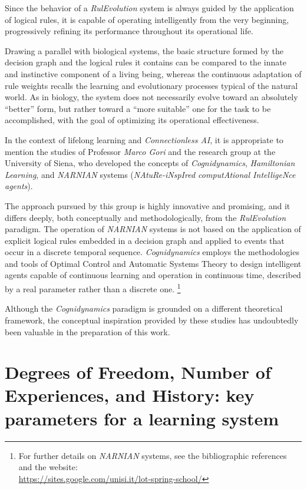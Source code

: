 \documentclass[12pt,a4paper]{article}
\begin{document}
Since the behavior of a \textit{RulEvolution} system is always guided by the application of logical rules, it is capable of operating intelligently from the very beginning, progressively refining its performance throughout its operational life.

Drawing a parallel with biological systems, the basic structure formed by the decision graph and the logical rules it contains can be compared to the innate and instinctive component of a living being, whereas the continuous adaptation of rule weights recalls the learning and evolutionary processes typical of the natural world.  
As in biology, the system does not necessarily evolve toward an absolutely “better” form, but rather toward a “more suitable” one for the task to be accomplished, with the goal of optimizing its operational effectiveness.

In the context of lifelong learning and \textit{Connectionless AI}, it is appropriate to mention the studies of Professor \textit{Marco Gori} and the research group at the University of Siena, who developed the concepts of \textit{Cognidynamics}, \textit{Hamiltonian Learning}, and \textit{NARNIAN} systems (\textit{NAtuRe-iNspIred computAtional IntelligeNce agents}).

The approach pursued by this group is highly innovative and promising, and it differs deeply, both conceptually and methodologically, from the \textit{RulEvolution} paradigm.  
The operation of \textit{NARNIAN} systems is not based on the application of explicit logical rules embedded in a decision graph and applied to events that occur in a discrete temporal sequence.  
\textit{Cognidynamics} employs the methodologies and tools of Optimal Control and Automatic Systems Theory to design intelligent agents capable of continuous learning and operation in continuous time, described by a real parameter rather than a discrete one. {\footnote{For further details on \textit{NARNIAN} systems, see the bibliographic references and the website: \\ \url{https://sites.google.com/unisi.it/lot-spring-school/}}}


Although the \textit{Cognidynamics} paradigm is grounded on a different theoretical framework, the conceptual inspiration provided by these studies has undoubtedly been valuable in the preparation of this work.


\section{Degrees of Freedom, Number of Experiences, and History: key parameters for a learning system}
\end{document}

